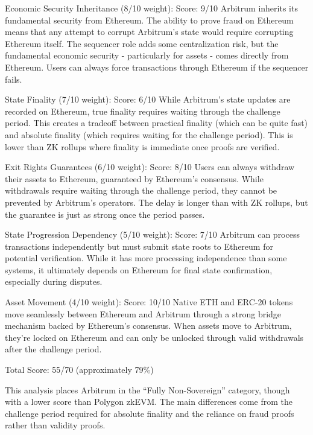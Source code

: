 \documentclass[
  letterpaper,
  DIV=11,
  numbers=noendperiod]{scrreprt}
\begin{document}
Economic Security Inheritance (8/10 weight): Score: 9/10 Arbitrum
inherits its fundamental security from Ethereum. The ability to prove
fraud on Ethereum means that any attempt to corrupt Arbitrum's state
would require corrupting Ethereum itself. The sequencer role adds some
centralization risk, but the fundamental economic security -
particularly for assets - comes directly from Ethereum. Users can always
force transactions through Ethereum if the sequencer fails.

State Finality (7/10 weight): Score: 6/10 While Arbitrum's state updates
are recorded on Ethereum, true finality requires waiting through the
challenge period. This creates a tradeoff between practical finality
(which can be quite fast) and absolute finality (which requires waiting
for the challenge period). This is lower than ZK rollups where finality
is immediate once proofs are verified.

Exit Rights Guarantees (6/10 weight): Score: 8/10 Users can always
withdraw their assets to Ethereum, guaranteed by Ethereum's consensus.
While withdrawals require waiting through the challenge period, they
cannot be prevented by Arbitrum's operators. The delay is longer than
with ZK rollups, but the guarantee is just as strong once the period
passes.

State Progression Dependency (5/10 weight): Score: 7/10 Arbitrum can
process transactions independently but must submit state roots to
Ethereum for potential verification. While it has more processing
independence than some systems, it ultimately depends on Ethereum for
final state confirmation, especially during disputes.

Asset Movement (4/10 weight): Score: 10/10 Native ETH and ERC-20 tokens
move seamlessly between Ethereum and Arbitrum through a strong bridge
mechanism backed by Ethereum's consensus. When assets move to Arbitrum,
they're locked on Ethereum and can only be unlocked through valid
withdrawals after the challenge period.

Total Score: 55/70 (approximately 79\%)

This analysis places Arbitrum in the ``Fully Non-Sovereign'' category,
though with a lower score than Polygon zkEVM. The main differences come
from the challenge period required for absolute finality and the
reliance on fraud proofs rather than validity proofs.
\end{document}
